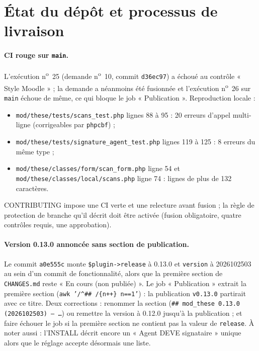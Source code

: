 \documentclass[11pt,a4paper]{article}
\newcommand{\fichier}[1]{\texttt{\small #1}}
\newcommand{\code}[1]{\texttt{#1}}
\begin{document}
\section{État du dépôt et processus de livraison}\label{sec:processus}

\paragraph{CI rouge sur \code{main}.}
L'exécution n\textsuperscript{o}~25 (demande n\textsuperscript{o}~10, commit \code{d36ec97}) a
échoué au contrôle « Style Moodle » ; la demande a néanmoins été fusionnée et l'exécution
n\textsuperscript{o}~26 sur \code{main} échoue de même, ce qui bloque le job « Publication ».
Reproduction locale :
\begin{itemize}
  \item \fichier{mod/these/tests/scans\_test.php} lignes 88 à 95 : 20 erreurs d'appel
    multi-ligne (corrigeables par \code{phpcbf}) ;
  \item \fichier{mod/these/tests/signature\_agent\_test.php} lignes 119 à 125 : 8 erreurs du
    même type ;
  \item \fichier{mod/these/classes/form/scan\_form.php} ligne 54 et
    \fichier{mod/these/classes/local/scans.php} ligne 74 : lignes de plus de 132 caractères.
\end{itemize}
CONTRIBUTING impose une CI verte et une relecture avant fusion ; la règle de protection de
branche qu'il décrit doit être activée (fusion obligatoire, quatre contrôles requis, une
approbation).

\paragraph{Version 0.13.0 annoncée sans section de publication.}
Le commit \code{a0e555c} monte \code{\$plugin->release} à 0.13.0 et \code{version} à 2026102503
au sein d'un commit de fonctionnalité, alors que la première section de \fichier{CHANGES.md}
reste « En cours (non publiée) ». Le job « Publication » extrait la première section
(\code{awk '/\^{}\#\#\ /\{n++\} n==1'}) : la publication \code{v0.13.0} partirait avec ce titre.
Deux corrections : renommer la section (\code{\#\# mod\_these 0.13.0 (2026102503) --- …}) ou
remettre la version à 0.12.0 jusqu'à la publication ; et faire échouer le job si la première
section ne contient pas la valeur de \code{release}. À noter aussi : l'INSTALL décrit encore un
« Agent DEVE signataire » unique alors que le réglage accepte désormais une liste.
\end{document}
